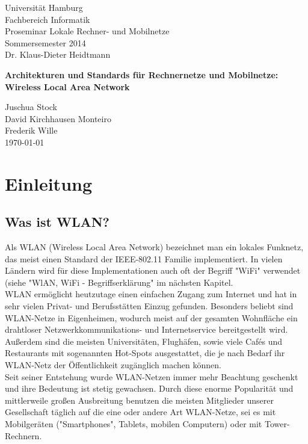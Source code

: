 \documentclass[a4paper,13pt]{scrartcl}
\begin{document}
\begin{titlepage}
\begin{small}
\vfill {Universität Hamburg \\ Fachbereich Informatik \\ Proseminar Lokale Rechner- und Mobilnetze \\ Sommersemester 2014 \\ Dr. Klaus-Dieter Heidtmann }
\end{small}


\begin{center}
\begin{Large}
\vfill {\textsf{\textbf{
Architekturen und Standards für Rechnernetze und Mobilnetze: 
Wireless Local Area Network
}}}
\end{Large}
\end{center}


\begin{small}
\vfill Juschua Stock \\ David Kirchhausen Monteiro \\ Frederik Wille \\
\today
\end{small}

\end{titlepage}


\tableofcontents
\thispagestyle{empty}

\clearpage

\onehalfspacing

\pagestyle{plain}


\section{Einleitung}
\subsection{Was ist WLAN?}
Als WLAN (Wireless Local Area Network) bezeichnet man ein lokales Funknetz, das meist einen Standard der IEEE-802.11 Familie implementiert. In vielen Ländern wird für diese Implementationen auch oft der Begriff "WiFi" verwendet (siehe "WlAN, WiFi - Begriffserklärung" im nächsten Kapitel.\\
WLAN ermöglicht heutzutage einen einfachen Zugang zum Internet und hat in sehr vielen Privat- und Berufsstätten Einzug gefunden. Besonders beliebt sind WLAN-Netze in Eigenheimen, wodurch meist auf der gesamten Wohnfläche ein drahtloser Netzwerkkommunikations- und Internetservice bereitgestellt wird. Außerdem sind die meisten Universitäten, Flughäfen, sowie viele Cafés und Restaurants mit sogenannten Hot-Spots ausgestattet, die je nach Bedarf ihr WLAN-Netz der Öffentlichkeit zugänglich machen können.\\
Seit seiner Entstehung wurde WLAN-Netzen immer mehr Beachtung geschenkt und ihre Bedeutung ist stetig gewachsen. Durch diese enorme Popularität und mittlerweile großen Ausbreitung benutzen die meisten Mitglieder unserer Gesellschaft täglich auf die eine oder andere Art WLAN-Netze, sei es mit Mobilgeräten ("Smartphones", Tablets, mobilen Computern) oder mit Tower-Rechnern.
\end{document}
